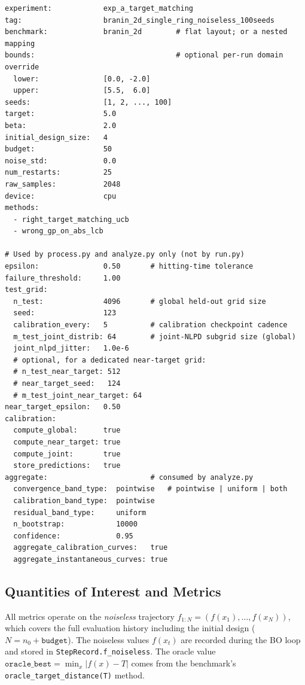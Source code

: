 \documentclass[11pt]{article}
\begin{document}
\begin{lstlisting}[caption={Current smoke configuration (\texttt{smoke\_1d.yaml})},label=lst:config]
experiment:            exp_a_target_matching
tag:                   branin_2d_single_ring_noiseless_100seeds
benchmark:             branin_2d        # flat layout; or a nested mapping
bounds:                                 # optional per-run domain override
  lower:               [0.0, -2.0]
  upper:               [5.5,  6.0]
seeds:                 [1, 2, ..., 100]
target:                5.0
beta:                  2.0
initial_design_size:   4
budget:                50
noise_std:             0.0
num_restarts:          25
raw_samples:           2048
device:                cpu
methods:
  - right_target_matching_ucb
  - wrong_gp_on_abs_lcb

# Used by process.py and analyze.py only (not by run.py)
epsilon:               0.50       # hitting-time tolerance
failure_threshold:     1.00
test_grid:
  n_test:              4096       # global held-out grid size
  seed:                123
  calibration_every:   5          # calibration checkpoint cadence
  m_test_joint_distrib: 64        # joint-NLPD subgrid size (global)
  joint_nlpd_jitter:   1.0e-6
  # optional, for a dedicated near-target grid:
  # n_test_near_target: 512
  # near_target_seed:   124
  # m_test_joint_near_target: 64
near_target_epsilon:   0.50
calibration:
  compute_global:      true
  compute_near_target: true
  compute_joint:       true
  store_predictions:   true
aggregate:                        # consumed by analyze.py
  convergence_band_type:  pointwise   # pointwise | uniform | both
  calibration_band_type:  pointwise
  residual_band_type:     uniform
  n_bootstrap:            10000
  confidence:             0.95
  aggregate_calibration_curves:   true
  aggregate_instantaneous_curves: true
\end{lstlisting}
 
\subsection{Quantities of Interest and Metrics}
\label{sec:quantities}
 
All metrics operate on the \emph{noiseless} trajectory
$f_{1:N} = (f(x_1), \ldots, f(x_N))$, which covers the full evaluation history
including the initial design ($N = n_0 + \texttt{budget}$).
The noiseless values $f(x_t)$ are recorded during the BO loop and stored in
\texttt{StepRecord.f\_noiseless}.
The oracle value $\texttt{oracle\_best} = \min_x|f(x)-T|$ comes from the benchmark's
\texttt{oracle\_target\_distance(T)} method.
 
\end{document}
